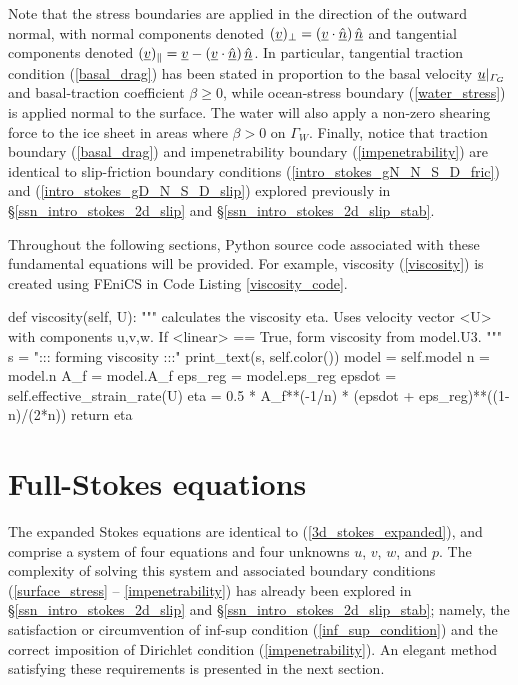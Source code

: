 Note that the stress boundaries are applied in the direction of the outward normal, with normal components denoted $(\underline{v})_{\perp} = \left( \underline{v} \cdot \underline{\hat{n}} \right) \underline{\hat{n}}$ and tangential components denoted $(\underline{v})_{\Vert} = \underline{v} - \left( \underline{v} \cdot \underline{\hat{n}} \right) \underline{\hat{n}}$.
In particular, tangential traction condition (\ref{basal_drag}) has been stated in proportion to the basal velocity $\underline{u} |_{\varGamma_G}$ and basal-traction coefficient $\beta \geq 0$, while ocean-stress boundary (\ref{water_stress}) is applied normal to the surface.
The water will also apply a non-zero shearing force to the ice sheet in areas where $\beta > 0$ on $\Gamma_W$.
Finally, notice that traction boundary (\ref{basal_drag}) and impenetrability boundary (\ref{impenetrability}) are identical to slip-friction boundary conditions (\ref{intro_stokes_gN_N_S_D_fric}) and (\ref{intro_stokes_gD_N_S_D_slip}) explored previously in \S \ref{ssn_intro_stokes_2d_slip} and \S \ref{ssn_intro_stokes_2d_slip_stab}.

Throughout the following sections, Python source code associated with these fundamental equations will be provided.  For example, viscosity (\ref{viscosity}) is created using FEniCS in Code Listing \ref{viscosity_code}. 

\begin{python}[label=viscosity_code, caption={FEniCS code used to generate viscosity $\eta$ as defined in the \texttt{Momentum} class, from which all of the momentum models of this chapter inherit.}]
def viscosity(self, U):
  """
  calculates the viscosity eta.  Uses velocity vector <U> with
  components u,v,w.  If <linear> == True, form viscosity from model.U3.
  """
  s  = "::: forming viscosity :::"
  print_text(s, self.color())
  model    = self.model
  n        = model.n
  A_f      = model.A_f
  eps_reg  = model.eps_reg
  epsdot   = self.effective_strain_rate(U)
  eta      = 0.5 * A_f**(-1/n) * (epsdot + eps_reg)**((1-n)/(2*n))
  return eta
\end{python}

\section{Full-Stokes equations} \label{ssn_full_stokes}

The expanded Stokes equations are identical to (\ref{3d_stokes_expanded}), and comprise a system of four equations and four unknowns $u$, $v$, $w$, and $p$.  The complexity of solving this system and associated boundary conditions (\ref{surface_stress} -- \ref{impenetrability}) has already been explored in \S \ref{ssn_intro_stokes_2d_slip} and \S \ref{ssn_intro_stokes_2d_slip_stab}; namely, the satisfaction or circumvention of inf-sup condition (\ref{inf_sup_condition}) and the correct imposition of Dirichlet condition (\ref{impenetrability}).  An elegant method satisfying these requirements is presented in the next section.

